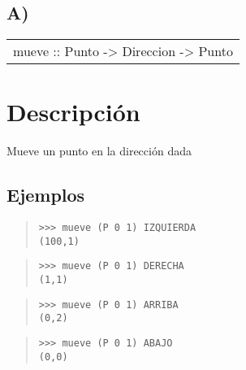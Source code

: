 \subsection{A)}
\begin{haddockdesc}
\item[\begin{tabular}{@{}l}
mueve :: Punto -> Direccion -> Punto
\end{tabular}]
{\haddockbegindoc
\section*{Descripción}
Mueve un punto en la dirección dada\par
\subsection*{Ejemplos}
\begin{quote}
{\haddockverb\begin{verbatim}
>>> mueve (P 0 1) IZQUIERDA
(100,1)

\end{verbatim}}
\end{quote}
\begin{quote}
{\haddockverb\begin{verbatim}
>>> mueve (P 0 1) DERECHA
(1,1)

\end{verbatim}}
\end{quote}
\begin{quote}
{\haddockverb\begin{verbatim}
>>> mueve (P 0 1) ARRIBA
(0,2)

\end{verbatim}}
\end{quote}
\begin{quote}
{\haddockverb\begin{verbatim}
>>> mueve (P 0 1) ABAJO
(0,0)

\end{verbatim}}
\end{quote}}
\end{haddockdesc}
